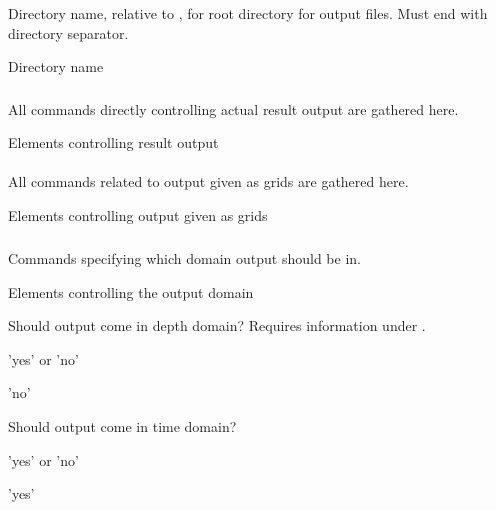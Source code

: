 \subsubsection{} 
 \slist
   \item \Description Directory name, relative to , for root directory for output files. Must end with directory separator.
   \item \Argument Directory name
   \item \Default
 \elist

\subsubsection{}
 \slist
   \item \Description All commands directly controlling actual result output are gathered here.
   \item \Argument Elements controlling result output
   \item \Default
 \elist

\paragraph{}
 \slist
   \item \Description All commands related to output given as grids are gathered here.
   \item \Argument Elements controlling output given as grids
   \item \Default
 \elist

\subparagraph{}
 \slist
   \item \Description Commands specifying which domain output should be in.
   \item \Argument Elements controlling the output domain
   \item \Default
 \elist

 \slist
   \item \Description Should output come in depth domain? Requires information under .
   \item \Argument 'yes' or 'no'
   \item \Default 'no'
 \elist

 \slist
   \item \Description Should output come in time domain?
   \item \Argument 'yes' or 'no'
   \item \Default 'yes'
 \elist

